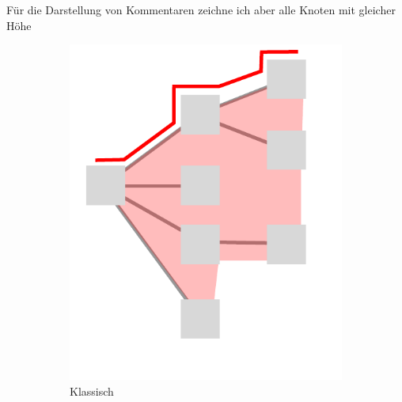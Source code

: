 \documentclass[nobib, nohyper, a4paper,openany]{tufte-book}
\begin{document}
Für die Darstellung von Kommentaren zeichne ich aber alle Knoten mit gleicher Höhe 

\begin{figure}
  \centering
  \begin{subfigure}[b]{0.3\textwidth}
    \includegraphics[width=\textwidth]{figures/tree_display1.pdf} 
    \caption{ Klassisch }  
    \label{fig:treesa}   
  \end{subfigure}
  \begin{subfigure}[b]{0.3\textwidth}

\end{subfigure}
\end{figure}
\end{document}
